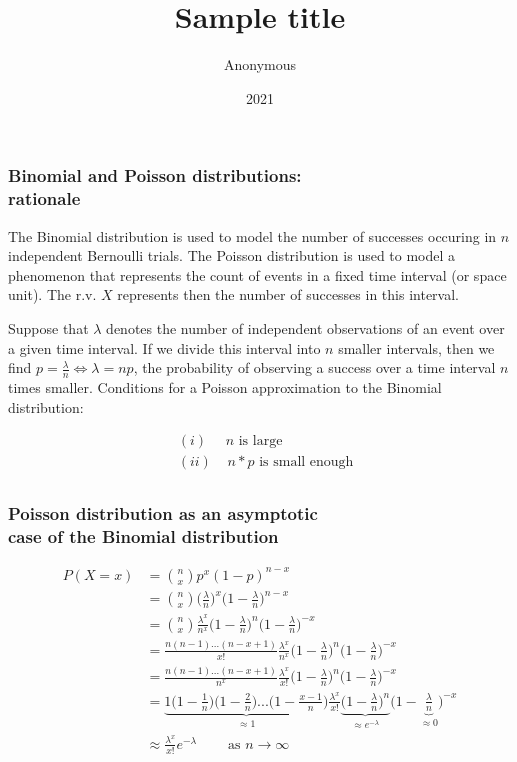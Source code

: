 \documentclass[border=5mm, convert, usenames, dvipsnames,beamer]{standalone}
\title{Sample title}
\author{Anonymous}
\institute{Overleaf}
\date{2021}
\begin{document}
\begin{frame}
\frametitle{Binomial and Poisson distributions: \\ rationale}

\vspace{55}
\noindent
The Binomial distribution is used to model the number of successes occuring in $n$ independent Bernoulli trials. The Poisson distribution is used to model a phenomenon that represents the count of events in a fixed time interval (or space unit). The r.v. $X$ represents then the number of successes in this interval.


\vspace{10}
\noindent
Suppose that $\lambda$ denotes the number of independent observations of an event over a given time interval. If we divide this interval into $n$ smaller intervals, then we find $ p = \frac{\lambda}{n} \Leftrightarrow \lambda = np$, the probability of observing a success over a time interval $n$ times smaller. Conditions for a Poisson approximation to the Binomial distribution:

\vspace{5}
$$
\begin{align*}
& (i) \ \ \ \ \ \  n  \text{  is large} \\
& (ii) \ \ \ \ \  n * p \text{  is small enough} \\
\end{align}
$$
\par
\end{frame}


\begin{frame}[ fragile]{}

\frametitle{Poisson distribution as an asymptotic\\
 case of the Binomial distribution}

\footnotesize
\vspace{55}
\noindent
$$
\begin{align*} 
 P(X=x) & = \binom{n}{x} p^{x} (1-p)^{n-x}\\
&  = \binom{n}{x} \bigg( \frac{\lambda}{n} \bigg)^{x}  \bigg(1-\frac{\lambda}{n} \bigg)^{n-x}\\
&  = \binom{n}{x} \frac{\lambda^{x}}{n^{x}} \bigg(1-\frac{\lambda}{n} \bigg)^{n}  \bigg(1-\frac{\lambda}{n} \bigg)^{-x}\\
& = \frac{n (n-1)...(n-x+1)}{x!} \frac{\lambda^{x}}{n^x} \bigg(1-\frac{\lambda}{n} \bigg)^{n}  \bigg(1-\frac{\lambda}{n} \bigg)^{-x}\\
&  = \frac{n (n-1)...(n-x+1)}{n^x} \frac{\lambda^{x}}{x!} \bigg(1-\frac{\lambda}{n} \bigg)^{n}  \bigg(1-\frac{\lambda}{n} \bigg)^{-x}\\
&  = \underbrace{1 \bigg( 1- \frac{1}{n} \bigg) \bigg( 1- \frac{2}{n} \bigg) ... \bigg( 1- \frac{x-1}{n} \bigg) }_{\approx 1} \frac{\lambda^{x}}{x!} \underbrace{\bigg(1-\frac{\lambda}{n} \bigg)^{n}}_{\approx e^{-\lambda}}  \bigg(1-\underbrace{\frac{\lambda}{n}}_{\approx 0} \bigg)^{-x}\\
& \approx  \frac{\lambda^{x}}{x!} e^{-\lambda} \ \ \ \ \ \ \  \ \ \ \text{as $n \to \infty$}
\end{align*}
$$

\end{frame}
\end{document}
